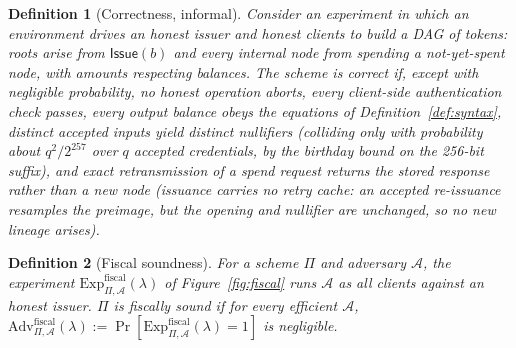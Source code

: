 \documentclass[11pt]{article}
\newtheorem{definition}{Definition}
\newcommand{\adv}{\mathcal{A}}
\begin{document}
\begin{definition}[Correctness, informal]
\label{def:correctness}
Consider an experiment in which an environment drives an honest issuer and
honest clients to build a DAG of tokens: roots arise from
$\mathsf{Issue}(b)$ and every internal node from spending a
not-yet-spent node, with amounts respecting balances. The scheme is correct
if, except with negligible probability, no honest operation aborts, every
client-side authentication check passes, every output balance obeys the
equations of Definition~\ref{def:syntax}, distinct accepted inputs yield
distinct nullifiers (colliding only with probability about
$q^{2}/2^{257}$ over $q$ accepted credentials, by the birthday bound on
the 256-bit suffix), and exact retransmission of a \emph{spend} request
returns the stored response rather than a new node (issuance carries no
retry cache: an accepted re-issuance resamples the preimage, but the
opening and nullifier are unchanged, so no new lineage arises).
\end{definition}

\begin{definition}[Fiscal soundness]
\label{def:fiscal}
For a scheme $\Pi$ and adversary $\adv$, the experiment
$\mathrm{Exp}^{\mathrm{fiscal}}_{\Pi,\adv}(\lambda)$ of
Figure~\ref{fig:fiscal} runs $\adv$ as all clients against an honest
issuer. $\Pi$ is \emph{fiscally sound} if for every efficient $\adv$,
$\mathrm{Adv}^{\mathrm{fiscal}}_{\Pi,\adv}(\lambda) :=
\Pr[\mathrm{Exp}^{\mathrm{fiscal}}_{\Pi,\adv}(\lambda) = 1]$
is negligible.
\end{definition}
\end{document}

